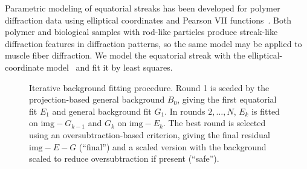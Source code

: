 \documentclass[journal,article,submit,moreauthors]{Definitions/mdpi}
\begin{document}
Parametric modeling of equatorial streaks has been developed for polymer diffraction data using elliptical coordinates and Pearson VII functions~\citep{MurthyZeroGrubb1997}. Both polymer and biological samples with rod-like particles produce streak-like diffraction features in diffraction patterns, so the same model may be applied to muscle fiber diffraction. We model the equatorial streak with the elliptical-coordinate model~\citep{MurthyZeroGrubb1997} and fit it by least squares.

\begin{figure}[h]
\centering
{}
\caption{Iterative background fitting procedure. Round 1 is seeded by the projection-based general background $B_0$, giving the first equatorial fit $E_1$ and general background fit $G_1$. In rounds $2,\dots,N$, $E_k$ is fitted on $\mathrm{img}-G_{k-1}$ and $G_k$ on $\mathrm{img}-E_k$. The best round is selected using an oversubtraction-based criterion, giving the final residual $\mathrm{img}-E-G$ (``final'') and a scaled version with the background scaled to reduce oversubtraction if present (``safe'').}
\label{fig:two_stage_pipeline}
\end{figure}
\end{document}
